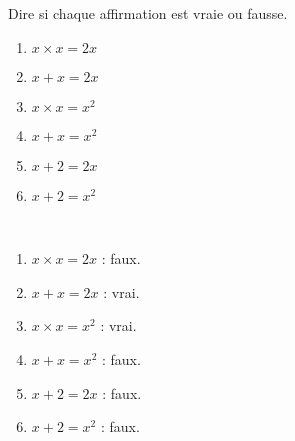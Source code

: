 \begin{exercice*}
    Dire si chaque affirmation est vraie ou fausse.
    \begin{multicols}{2}
      \begin{enumerate}
         \item $x\times x = 2x$
         \item $x+x = 2x$
         \item $x\times x = x^{2}$
         \item $x+x =x^{2}$
         \item $x+2 =2x$
         \item $x+2=x^{2}$
      \end{enumerate}
   \end{multicols}
\end{exercice*}
 
\begin{corrige}
 \ \\ [-5mm]
   \begin{multicols}{2}
      \begin{enumerate}
         \item $x\times x = 2x$ : {\red faux}.
         \item $x+x = 2x$ : {\red vrai}.
         \item $x\times x = x^{2}$ : {\red vrai}.
         \item $x+x =x^{2}$ : {\red faux}.
         \item $x+2 =2x$ : {\red faux}.
         \item $x+2=x^{2}$ : {\red faux}.
      \end{enumerate}
   \end{multicols}
\end{corrige}